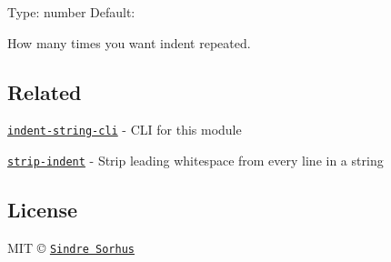 Type\+: {\ttfamily number} Default\+: {}

How many times you want {\ttfamily indent} repeated.

\subsection*{Related}


\begin{DoxyItemize}
\item \href{https://github.com/sindresorhus/indent-string-cli}{\tt indent-\/string-\/cli} -\/ C\+LI for this module
\item \href{https://github.com/sindresorhus/strip-indent}{\tt strip-\/indent} -\/ Strip leading whitespace from every line in a string
\end{DoxyItemize}

\subsection*{License}

M\+IT © \href{http://sindresorhus.com}{\tt Sindre Sorhus} 